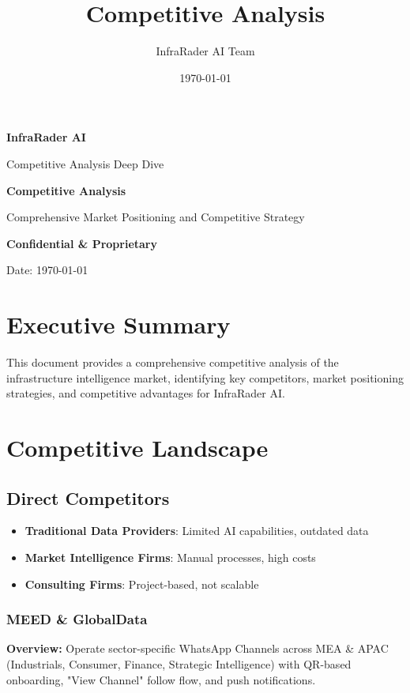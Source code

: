 \documentclass[business]{../templates/infraradar-main}
\title{Competitive Analysis}
\author{InfraRader AI Team}
\date{\today}
\begin{document}
\begin{titlepage}
    \centering
    \vspace*{2cm}
    {\Huge\bfseries\color{infraradar@primary} InfraRader AI\par}
    \vspace{0.5cm}
    {\Large\color{infraradar@text} Competitive Analysis Deep Dive\par}
    \vspace{2cm}
    {\huge\bfseries Competitive Analysis\par}
    \vspace{1cm}
    {\large Comprehensive Market Positioning and Competitive Strategy\par}
    \vspace{2cm}
    {\large\bfseries\color{infraradar@primary} Confidential \& Proprietary\par}
    {\large Date: \today\par}
\end{titlepage}

\tableofcontents
\newpage

\section{Executive Summary}

This document provides a comprehensive competitive analysis of the infrastructure intelligence market, identifying key competitors, market positioning strategies, and competitive advantages for InfraRader AI.

\section{Competitive Landscape}

\subsection{Direct Competitors}
\begin{itemize}
    \item \textbf{Traditional Data Providers}: Limited AI capabilities, outdated data
    \item \textbf{Market Intelligence Firms}: Manual processes, high costs
    \item \textbf{Consulting Firms}: Project-based, not scalable
\end{itemize}

\subsubsection{MEED \& GlobalData}
\textbf{Overview:} Operate sector-specific WhatsApp Channels across MEA \& APAC (Industrials, Consumer, Finance, Strategic Intelligence) with QR-based onboarding, "View Channel" follow flow, and push notifications.
\end{document}

